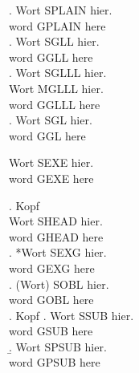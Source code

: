 
\GlossPhantomAlign

\ex. \gll Wort SPLAIN hier.\\
word GPLAIN here\\

\ex. \gll *Wort SGLL hier.\\
word GGLL here\\

\ex. \glll *Wort SGLLL hier.\\
Wort MGLLL hier.\\
word GGLLL here\\

\ex. \gl *Wort SGL hier.\\
word GGL here\endgl

\begin{exe}
\ex \gll *Wort SEXE hier.\\
word GEXE here\\
\end{exe}

\ex. Kopf\\ \gll *Wort SHEAD hier.\\
word GHEAD here\\

\exg. *Wort SEXG hier.\\
word GEXG here\\

\ex. \gll *(Wort) SOBL hier.\\
word GOBL here\\

\ex. Kopf
\a. \gll *Wort SSUB hier.\\
word GSUB here\\
\b. \gll Wort SPSUB hier.\\
word GPSUB here\\


